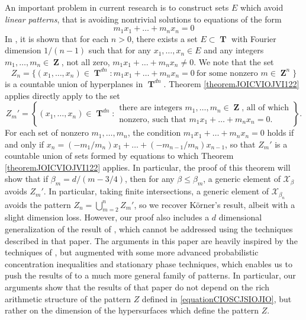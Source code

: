 \documentclass[dvipsnames,letterpaper,12pt]{article}
\numberwithin{equation}{section}
\DeclareMathOperator{\ZZ}{\mathbf{Z}}
\DeclareMathOperator{\TT}{\mathbf{T}}
\numberwithin{theorem}{section}
\begin{document}
An important problem in current research is to construct sets $E$ which avoid \emph{linear patterns}, that is avoiding nontrivial solutions to equations of the form
%
\[ m_1x_1 + \dots + m_nx_n = 0 \]
%
In \cite{Korner2}, it is shown that for each $n > 0$, there exists a set $E \subset \TT$ with Fourier dimension $1/(n-1)$ such that for any $x_1,\dots,x_n \in E$ and any integers $m_1,\dots,m_n \in \ZZ$, not all zero, $m_1x_1 + \dots + m_nx_n \neq 0$. We note that the set
%
\begin{equation} \label{equationCIOSCJSIOJIO}
    Z_n = \{ (x_1,\dots,x_n) \in \TT^{dn}: m_1x_1 + \dots + m_nx_n = 0\ \text{for some nonzero $m \in \ZZ^n$} \}
\end{equation}
%
is a countable union of hyperplanes in $\TT^{dn}$. Theorem \ref{theoremJOICVIOJVI122} applies directly apply to the set
%
\[ Z_m' = \left\{ (x_1,\dots,x_n) \in \TT^{dn}: \begin{array}{c}
            \text{there are integers $m_1,\dots,m_n \in \ZZ$, all of which}\\
            \text{nonzero, such that $m_1x_1 + \dots + m_nx_n = 0$.}
        \end{array} \right\}. \]
%
For each set of nonzero $m_1,\dots,m_n$, the condition $m_1x_1 + \dots + m_nx_n = 0$ holds if and only if $x_n = (-m_1/m_n) x_1 + \dots + (-m_{n-1}/m_n) x_{n-1}$, so that $Z_m'$ is a countable union of sets formed by equations to which Theorem \ref{theoremJOICVIOJVI122} applies. In particular, the proof of this theorem will show that if $\beta_m = d/(m-3/4)$, then for any $\beta \leq \beta_m$, a generic element of $\mathcal{X}_\beta$ avoids $Z_m'$. In particular, taking finite intersections, a generic element of $\mathcal{X}_{\beta_n}$ avoids the pattern $Z_n = \bigcup_{m = 2}^n Z_m'$, so we recover K\"{o}rner's result, albeit with a slight dimension loss. However, our proof also includes a $d$ dimensional generalization of the result of \cite{Korner2}, which cannot be addressed using the techniques described in that paper. The arguments in this paper are heavily inspired by the techniques of \cite{Korner2}, but augmented with some more advanced probabilistic concentration inequalities and stationary phase techniques, which enables us to push the results of \cite{Korner2} to a much more general family of patterns. In particular, our arguments show that the results of that paper do not depend on the rich arithmetic structure of the pattern $Z$ defined in \eqref{equationCIOSCJSIOJIO}, but rather on the dimension of the hypersurfaces which define the pattern $Z$.
\end{document}
